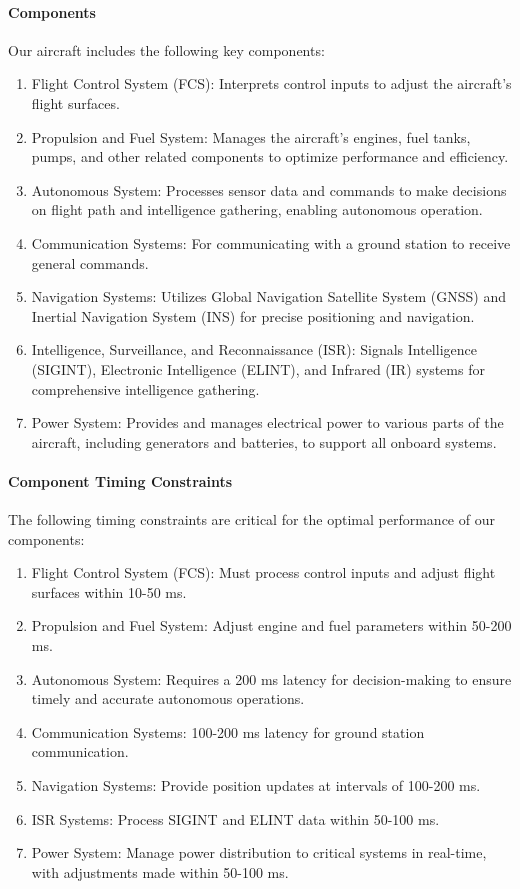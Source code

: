 \documentclass[a4paper,11pt]{article}
\begin{document}
	\paragraph{Components}
	Our aircraft includes the following key components:
	\begin{enumerate}[label=P\arabic*)]
		\item Flight Control System (FCS): Interprets control inputs to adjust the aircraft's flight surfaces.
		\item Propulsion and Fuel System: Manages the aircraft's engines, fuel tanks, pumps, and other related components to optimize performance and efficiency.
		\item Autonomous System: Processes sensor data and commands to make decisions on flight path and intelligence gathering, enabling autonomous operation.
		\item Communication Systems: For communicating with a ground station to receive general commands.
		\item Navigation Systems: Utilizes Global Navigation Satellite System (GNSS) and Inertial Navigation System (INS) for precise positioning and navigation.
		\item Intelligence, Surveillance, and Reconnaissance (ISR): Signals Intelligence (SIGINT), Electronic Intelligence (ELINT), and Infrared (IR) systems for comprehensive intelligence gathering.
		\item Power System: Provides and manages electrical power to various parts of the aircraft, including generators and batteries, to support all onboard systems.
	\end{enumerate}

	\paragraph{Component Timing Constraints}
	The following timing constraints are critical for the optimal performance of our components:
	\begin{enumerate}[label=T\arabic*)]
		\item Flight Control System (FCS): Must process control inputs and adjust flight surfaces within 10-50 ms.
		\item Propulsion and Fuel System: Adjust engine and fuel parameters within 50-200 ms.
		\item Autonomous System: Requires a 200 ms latency for decision-making to ensure timely and accurate autonomous operations.
		\item Communication Systems: 100-200 ms latency for ground station communication.
		\item Navigation Systems: Provide position updates at intervals of 100-200 ms.
		\item ISR Systems: Process SIGINT and ELINT data within 50-100 ms.
		\item Power System: Manage power distribution to critical systems in real-time, with adjustments made within 50-100 ms.
	\end{enumerate}
\end{document}
